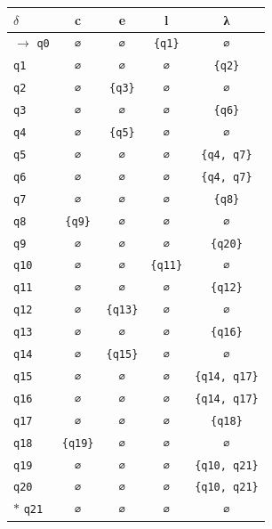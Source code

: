 \documentclass[11pt]{article}
\begin{document}
\begin{center}\small\begin{tabular}{lcccc}\toprule
$\delta$ & c & e & l & λ \\\midrule
$\to$ \texttt{q0} & \texttt{∅} & \texttt{∅} & \texttt{\{q1\}} & \texttt{∅} \\
 \texttt{q1} & \texttt{∅} & \texttt{∅} & \texttt{∅} & \texttt{\{q2\}} \\
 \texttt{q2} & \texttt{∅} & \texttt{\{q3\}} & \texttt{∅} & \texttt{∅} \\
 \texttt{q3} & \texttt{∅} & \texttt{∅} & \texttt{∅} & \texttt{\{q6\}} \\
 \texttt{q4} & \texttt{∅} & \texttt{\{q5\}} & \texttt{∅} & \texttt{∅} \\
 \texttt{q5} & \texttt{∅} & \texttt{∅} & \texttt{∅} & \texttt{\{q4, q7\}} \\
 \texttt{q6} & \texttt{∅} & \texttt{∅} & \texttt{∅} & \texttt{\{q4, q7\}} \\
 \texttt{q7} & \texttt{∅} & \texttt{∅} & \texttt{∅} & \texttt{\{q8\}} \\
 \texttt{q8} & \texttt{\{q9\}} & \texttt{∅} & \texttt{∅} & \texttt{∅} \\
 \texttt{q9} & \texttt{∅} & \texttt{∅} & \texttt{∅} & \texttt{\{q20\}} \\
 \texttt{q10} & \texttt{∅} & \texttt{∅} & \texttt{\{q11\}} & \texttt{∅} \\
 \texttt{q11} & \texttt{∅} & \texttt{∅} & \texttt{∅} & \texttt{\{q12\}} \\
 \texttt{q12} & \texttt{∅} & \texttt{\{q13\}} & \texttt{∅} & \texttt{∅} \\
 \texttt{q13} & \texttt{∅} & \texttt{∅} & \texttt{∅} & \texttt{\{q16\}} \\
 \texttt{q14} & \texttt{∅} & \texttt{\{q15\}} & \texttt{∅} & \texttt{∅} \\
 \texttt{q15} & \texttt{∅} & \texttt{∅} & \texttt{∅} & \texttt{\{q14, q17\}} \\
 \texttt{q16} & \texttt{∅} & \texttt{∅} & \texttt{∅} & \texttt{\{q14, q17\}} \\
 \texttt{q17} & \texttt{∅} & \texttt{∅} & \texttt{∅} & \texttt{\{q18\}} \\
 \texttt{q18} & \texttt{\{q19\}} & \texttt{∅} & \texttt{∅} & \texttt{∅} \\
 \texttt{q19} & \texttt{∅} & \texttt{∅} & \texttt{∅} & \texttt{\{q10, q21\}} \\
 \texttt{q20} & \texttt{∅} & \texttt{∅} & \texttt{∅} & \texttt{\{q10, q21\}} \\
$*$ \texttt{q21} & \texttt{∅} & \texttt{∅} & \texttt{∅} & \texttt{∅} \\
\bottomrule\end{tabular}\end{center}
\end{document}
